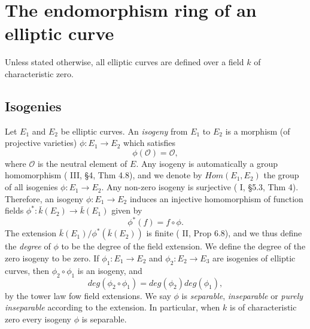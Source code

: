 \newpage
\section{The endomorphism ring of an elliptic curve}
\label{sec:endomorphism-ring-of-an-elliptic-curve}

Unless stated otherwise, all elliptic curves are defined over a field $k$ of
characteristic zero.

\subsection{Isogenies}
\label{sec:isogenies}

Let $E_{1}$ and $E_{2}$ be elliptic curves.  An \emph{isogeny} from $E_{1}$ to
$E_{2}$ is a morphism (of projective varieties) $\phi \colon E_{1} \rightarrow E_{2}$
which satisfies
\begin{equation*}
  \phi \left( \mathcal{O} \right) = \mathcal{O},
\end{equation*}
where $\mathcal{O}$ is the neutral element of $E$. 
Any isogeny is automatically a group homomorphism (\cite{silverman86} III, \S 4, Thm
4.8), and we denote by $Hom(E_{1},E_{2})$ the group of all isogenies $\phi : E_{1}
\rightarrow E_{2}$.  Any non-zero isogeny is surjective (\cite{shafarevich94} I, \S 5.3,
Thm 4).  Therefore, an isogeny $\phi \colon E_{1} \rightarrow E_{2}$ induces an
injective homomorphism of function fields $\phi^{*} \colon \bar{k}\left(E_{2}\right)
\rightarrow \bar{k}\left(E_{1}\right)$ given by
\begin{equation*}
  \phi^{*}\left(f\right) = f \circ \phi.
\end{equation*}
The extension $\bar{k}\left(E_{1}\right) /
\phi^{*}\left(\bar{k}\left(E_{2}\right)\right)$ is finite (\cite{hartshorne77} II,
Prop 6.8), and we thus define the \emph{degree} of $\phi$ to be the degree of the
field extension.  We define the degree of the zero isogeny to be zero.  If $\phi_{1}
\colon E_{1} \rightarrow E_{2}$ and $\phi_{2} \colon E_{2} \rightarrow E_{3}$ are
isogenies of elliptic curves, then $\phi_{2} \circ \phi_{1}$ is an isogeny, and
\begin{equation}
  \label{eq:degree-of-composition}
  deg \left( \phi_{2} \circ \phi_{1} \right) = deg \left( \phi_{2} \right) deg \left( \phi_{1} \right),
\end{equation}
by the tower law fow field extensions.
We say $\phi$ is \emph{separable}, \emph{inseparable} or \emph{purely inseparable}
according to the extension.  In particular, when $k$ is of characteristic zero every
isogeny $\phi$ is separable.

